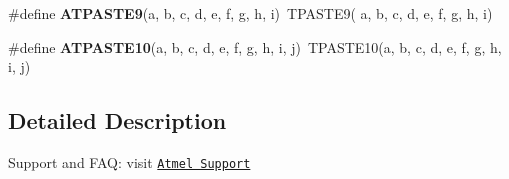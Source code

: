 \begin{DoxyCompactItemize}
\item 
\hypertarget{group__group__xmega__utils__tpaste_ga5305e79258b2256febfac6ebec8838c2}{\#define {\bfseries A\-T\-P\-A\-S\-T\-E9}(a, b, c, d, e, f, g, h, i)~T\-P\-A\-S\-T\-E9( a, b, c, d, e, f, g, h, i)}\label{group__group__xmega__utils__tpaste_ga5305e79258b2256febfac6ebec8838c2}

\item 
\hypertarget{group__group__xmega__utils__tpaste_ga3b9c4ca2ffbcec13ec3083ab95664ac9}{\#define {\bfseries A\-T\-P\-A\-S\-T\-E10}(a, b, c, d, e, f, g, h, i, j)~T\-P\-A\-S\-T\-E10(a, b, c, d, e, f, g, h, i, j)}\label{group__group__xmega__utils__tpaste_ga3b9c4ca2ffbcec13ec3083ab95664ac9}

\end{DoxyCompactItemize}


\subsection{Detailed Description}
Support and F\-A\-Q\-: visit \href{http://www.atmel.com/design-support/}{\tt Atmel Support} 